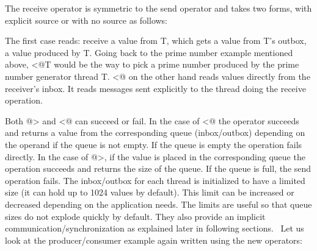 The receive operator is symmetric to the send operator and takes two
forms, with explicit source or with no source as follows:


The first case reads: receive a value from T, which gets a value from
\textsf{T}{\textquoteright}s outbox, a value produced by
\textsf{T}. Going back to the prime number example mentioned
above, \textsf{{\textless}@T} would be the way to pick a
prime number produced by the prime number generator thread
\textsf{T}. \textsf{{\textless}@} on the other
hand reads values directly from the receiver{\textquoteright}s inbox.
It reads messages sent explicitly to the thread doing the receive
operation.

Both \textsf{@{\textgreater}} and
\textsf{{\textless}@ }can succeed or fail. In the case
of \textsf{{\textless}@} the operator succeeds and
returns a value from the corresponding queue (inbox/outbox) depending
on the operand if the queue is not empty. If the queue is empty the
operation fails directly. In the case of
\textsf{@{\textgreater}}, if the value is placed in the
corresponding queue the operation succeeds and returns the size of the
queue. If the queue is full, the send operation fails. The inbox/outbox
for each thread is initialized to have a limited size (it can hold up
to 1024 values by default). This limit can be increased or decreased
depending on the application needs. The limits are useful so that queue
sizes do not explode quickly by default. They also provide an implicit
communication/synchronization as explained later in following sections.
\ Let us look at the producer/consumer example again written using the
new operators:


